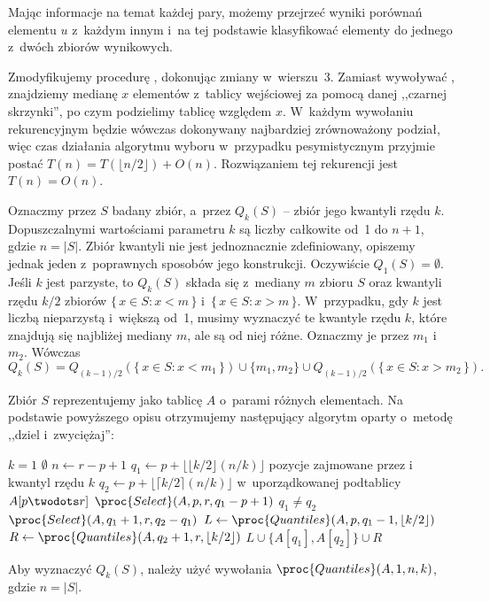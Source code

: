 Mając informacje na temat każdej pary, możemy przejrzeć wyniki porównań elementu $u$ z~każdym innym i~na tej podstawie klasyfikować elementy do jednego z~dwóch zbiorów wynikowych.

\exercise %
Zmodyfikujemy procedurę , dokonując zmiany w~wierszu~3. Zamiast wywoływać , znajdziemy medianę $x$ elementów z~tablicy wejściowej za pomocą danej ,,czarnej skrzynki'', po czym podzielimy tablicę względem $x$. W~każdym wywołaniu rekurencyjnym będzie wówczas dokonywany najbardziej zrównoważony podział, więc czas działania algorytmu wyboru w~przypadku pesymistycznym przyjmie postać $T(n)=T(\lfloor n/2\rfloor)+O(n)$. Rozwiązaniem tej rekurencji jest $T(n)=O(n)$.

\exercise %
Oznaczmy przez $S$ badany zbiór, a~przez $Q_k(S)$ -- zbiór jego kwantyli rzędu $k$. Dopuszczalnymi wartościami parametru $k$ są liczby całkowite od~1 do $n+1$, gdzie $n=|S|$. Zbiór kwantyli nie jest jednoznacznie zdefiniowany, opiszemy jednak jeden z~poprawnych sposobów jego konstrukcji. Oczywiście $Q_1(S)=\emptyset$. Jeśli $k$ jest parzyste, to $Q_k(S)$ składa się z~mediany $m$ zbioru $S$ oraz kwantyli rzędu $k/2$ zbiorów $\{\,x\in S:x<m\,\}$ i~$\{\,x\in S:x>m\,\}$. W~przypadku, gdy $k$ jest liczbą nieparzystą i~większą od~1, musimy wyznaczyć te kwantyle rzędu $k$, które znajdują się najbliżej mediany $m$, ale są od niej różne. Oznaczmy je przez $m_1$ i~$m_2$. Wówczas
\[
	Q_k(S) = Q_{(k-1)/2}(\{\,x\in S:x<m_1\,\})\cup\{m_1,m_2\}\cup Q_{(k-1)/2}(\{\,x\in S:x>m_2\,\}).
\]

Zbiór $S$ reprezentujemy jako tablicę $A$ o~parami różnych elementach. Na podstawie powyższego opisu otrzymujemy następujący algorytm oparty o~metodę ,,dziel i~zwyciężaj'':
\begin{codebox}
\li	\If $k=1$
\li		\Then \Return $\emptyset$
		\End
\li	$n\gets r-p+1$
\li	$q_1\gets p+\lfloor\lfloor k/2\rfloor(n/k)\rfloor$ \>\>\>\>\>\>\Comment pozycje zajmowane przez  i~ kwantyl rzędu $k$
\li	$q_2\gets p+\lfloor\lceil k/2\rceil(n/k)\rfloor$ \>\>\>\>\>\>\>w~uporządkowanej podtablicy $A[p\twodots r]$
\li	$\proc{Select}(A,p,r,q_1-p+1)$
\li	\If $q_1\ne q_2$
\li		\Then $\proc{Select}(A,q_1+1,r,q_2-q_1)$ \label{li:quantiles-second-select}
		\End
\li	$L\gets\proc{Quantiles}(A,p,q_1-1,\lfloor k/2\rfloor)$
\li	$R\gets\proc{Quantiles}(A,q_2+1,r,\lfloor k/2\rfloor)$
\li	\Return $L\cup\{A[q_1],A[q_2]\}\cup R$
\end{codebox}
Aby wyznaczyć $Q_k(S)$, należy użyć wywołania $\proc{Quantiles}(A,1,n,k)$, gdzie $n=|S|$.

